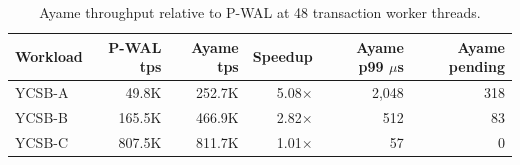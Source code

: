 \begin{table}[t]
  \centering
  \caption{Ayame throughput relative to P-WAL at 48 transaction worker threads.}
  \label{tab:ayame-speedup-48worker}
  \small
  \setlength{\tabcolsep}{6pt}
  \begin{tabular}{lrrrrr}
    \hline
    Workload & P-WAL tps & Ayame tps & Speedup & Ayame p99 $\mu$s & Ayame pending \\
    \hline
    YCSB-A & 49.8K & 252.7K & 5.08$\times$ & 2,048 & 318 \\
    YCSB-B & 165.5K & 466.9K & 2.82$\times$ & 512 & 83 \\
    YCSB-C & 807.5K & 811.7K & 1.01$\times$ & 57 & 0 \\
    \hline
  \end{tabular}
\end{table}
